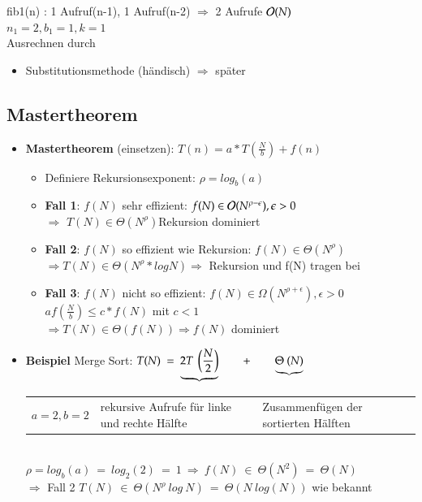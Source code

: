 fib1(n) : 1 Aufruf(n-1), 1 Aufruf(n-2) $\Rightarrow$ 2 Aufrufe $\mathcal{O}{}(N)$ \\
\hspace*{5cm} $n_1 = 2, b_1 = 1, k = 1$ \\
Ausrechnen durch
\begin{itemize}
    \item Substitutionsmethode (\glqq händisch\grqq) $\Rightarrow$ später
\end{itemize}
    \subsection{Mastertheorem}
    \begin{itemize}
    \item \textbf{Mastertheorem} (einsetzen): $T(n) = a* T\left(\frac{N}{b}\right) + f(n)$
    \begin{itemize}[label={}]
        \item Definiere Rekursionsexponent: $\rho = log_b(a)$
        \item \textbf{Fall 1}: $f(N)$ sehr effizient: $f(N) \in \mathcal{O}{}(N^{\rho-\epsilon}), \epsilon > 0$ \\
        $\Rightarrow$ $T(N) \in \Theta(N^\rho)$Rekursion dominiert
        \item \textbf{Fall 2}: $f(N)$ so effizient wie Rekursion: $f(N) \in \Theta(N^\rho)$ \\
        $\Rightarrow T(N) \in \Theta(N^\rho * logN) \Rightarrow$ Rekursion und f(N) tragen bei
        \item \textbf{Fall 3}: $f(N)$ nicht so effizient: $f(N) \in \Omega(N^{\rho + \epsilon}), \epsilon > 0$ \\
        \hspace*{5cm} $a f\left(\frac{N}{b}\right) \leq c* f(N)$ mit $c < 1$ \\
        $\Rightarrow T(N) \in \Theta(f(N)) \Rightarrow f(N)$ dominiert
    \end{itemize}
    \item \textbf{Beispiel} Merge Sort: $T(N)\ =\ \underbrace{2 T \ \left(\frac{N}{2}\right)}\hspace*{0.7cm} +\hspace*{0.7cm} \underbrace{\Theta\ (N)}$\\
    \begin{tabular}{L{4cm} L{3cm} L{3cm}}
        $a=2, b=2$ & rekursive Aufrufe für linke und rechte Hälfte & Zusammenfügen der sortierten Hälften\\
    \end{tabular}\\
    \hspace*{1cm} $\rho = log_b(a) \ = \ log_2(2) \ = \ 1 \ \Rightarrow \ f(N)\ \in \ \Theta(N^2) \ = \ \Theta(N)$\\
    $\Rightarrow$ Fall 2  \hspace*{1cm} $T(N)\  \in\  \Theta(N^{\rho}\ log\ N)\ =\ \boxed{\Theta(N\ log(N))}$ wie bekannt
\end{itemize}

